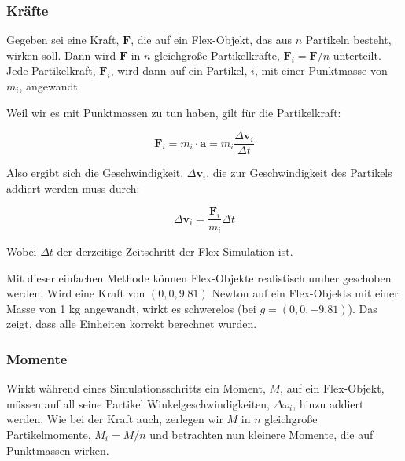 \subsubsection{Kräfte}
Gegeben sei eine Kraft, $\textbf{F}$, die auf ein Flex-Objekt, das aus $n$ Partikeln besteht, wirken soll. Dann wird $\textbf{F}$ in $n$ gleichgroße Partikelkräfte, $\textbf{F}_i = \textbf{F} / n$ unterteilt. Jede Partikelkraft, $\textbf{F}_i$, wird dann auf ein Partikel, $i$, mit einer Punktmasse von $m_i$, angewandt.

Weil wir es mit Punktmassen zu tun haben, gilt für die Partikelkraft:

\begin{equation}
\textbf{F}_i = m_i \cdot \textbf{a} = m_i \dfrac{\Delta \textbf{v}_i}{\Delta t}
\label{form_F}
\end{equation}

Also ergibt sich die Geschwindigkeit, $\Delta \textbf{v}_i$, die zur Geschwindigkeit des Partikels addiert werden muss durch:

\begin{equation}
\Delta \textbf{v}_i = \dfrac{\textbf{F}_i}{m_i}\Delta t
\label{form_dv}
\end{equation}

Wobei $\Delta t$ der derzeitige Zeitschritt der Flex-Simulation ist. 


Mit dieser einfachen Methode können Flex-Objekte realistisch umher geschoben werden. Wird eine Kraft von $(0 , 0 , 9.81 )$ Newton auf ein Flex-Objekts mit einer Masse von 1 kg angewandt, wirkt es schwerelos (bei $g=(0 , 0 , -9.81 )$). Das zeigt, dass alle Einheiten korrekt berechnet wurden.


\subsubsection{Momente}

Wirkt während eines Simulationsschritts ein Moment, $M$, auf ein Flex-Objekt, müssen auf all seine Partikel Winkelgeschwindigkeiten, $\Delta \omega_i$, hinzu addiert werden. Wie bei der Kraft auch, zerlegen wir $M$ in $n$ gleichgroße Partikelmomente, $M_i=M/n$ und betrachten nun kleinere Momente, die auf Punktmassen wirken.

